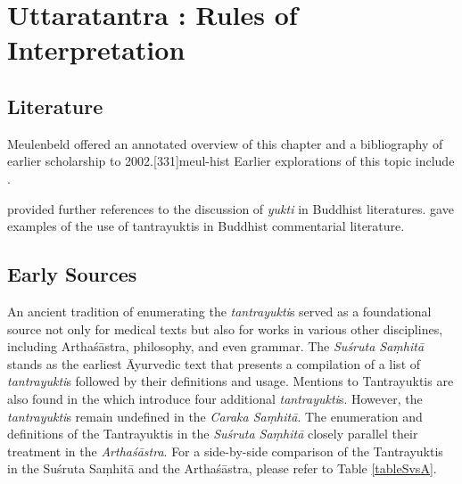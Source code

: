 
\chapter{Uttaratantra :  Rules of Interpretation}

\section{Literature} 

Meulenbeld offered an annotated overview of this chapter and a bibliography
of earlier scholarship to 2002.[331]{meul-hist}  Earlier explorations 
of this topic include \cite{dasg-1952,
lele-1981,
mejo-2000,
nara-1949,
ober-1967,
scha-1993,
sing-2003,
muth-1976}. 


\citet[105--106, fn.\,109]{prei-2013} provided further references to the
discussion of \emph{yukti} in Buddhist literatures. \citet{mane-2008}
gave examples of the use of tantrayuktis in Buddhist commentarial
literature.


\section{Early Sources}

An ancient tradition of enumerating the \textit{tantrayukti}s served as a foundational source not only for medical texts but also for works in various other disciplines, including Arthaśāstra, philosophy, and even grammar. The \textit{Suśruta Saṃhitā} stands as the earliest Āyurvedic text that presents a compilation of a list of \textit{tantrayukti}s followed by their definitions and usage. Mentions to Tantrayuktis are also found in the  which introduce four additional \textit{tantrayukti}s. However, the \textit{tantrayukti}s remain undefined in the \textit{Caraka Saṃhitā}. The enumeration and definitions of the Tantrayuktis in the \textit{Suśruta Saṃhitā} closely parallel their treatment in the \textit{Arthaśāstra}. For a side-by-side comparison of the Tantrayuktis in the Suśruta Saṃhitā and the Arthaśāstra, please refer to Table \ref{tableSvsA}.


